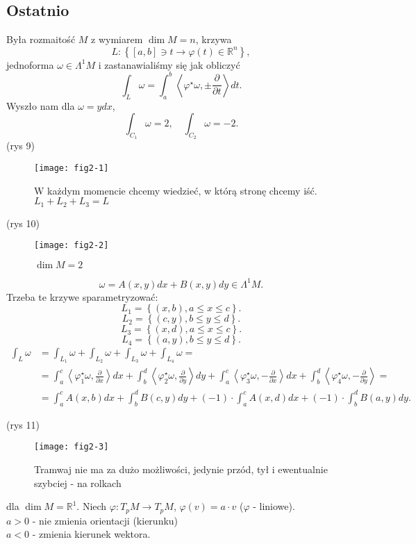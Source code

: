 \documentclass[../main.tex]{subfiles}
\begin{document}
    \subsection{Ostatnio}
    Była rozmaitość $M$ z wymiarem $\dim M = n$, krzywa
    \[
        L : \left\{ [a,b]\ni t \to \varphi(t)\in \mathbb{R}^n \right\}
    ,\]
jednoforma $\omega \in \Lambda^1M$ i zastanawialiśmy się jak obliczyć
\[
\int_L\omega = \int_a^b\left<\varphi^\star \omega, \pm\frac{\partial }{\partial t}  \right>dt
.\]
Wyszło nam dla $\omega = ydx$,
 \[
\int_{C_1}\omega = 2,\quad \int_{C_2}\omega = -2
.\]
(rys 9)
\begin{figure}[h]
    \centering
    \texttt{[image: fig2-1]}
    \caption{W każdym momencie chcemy wiedzieć, w którą stronę chcemy iść. $L_1 + L_2 + L_3 = L$}
    \label{fig:fig2-1}
\end{figure}
\begin{przyklad}
    (rys 10)
    \begin{figure}[h]
        \centering
        \texttt{[image: fig2-2]}
        \caption{$\dim M = 2$}
        \label{fig:fig2-2}
    \end{figure}
    \[
        \omega = A(x,y)dx + B(x,y)dy\in \Lambda^1M
    .\]
Trzeba te krzywe sparametryzować:
\[
    L_1 = \left\{ (x,b), a \le x \le c \right\}
.\]
\[
    L_2 = \left\{ (c,y), b \le y \le d \right\}
.\]
\[
    L_3 = \left\{ (x,d), a \le x \le c \right\}
.\]
\[
    L_4 = \left\{ (a,y), b \le y \le d \right\}
.\]
\begin{align*}
    \int_L\omega &= \int_{L_1}\omega + \int_{L_2}\omega + \int_{L_3}\omega + \int_{L_4}\omega =\\
    &= \int_a^c\left<\varphi_1^\star\omega, \frac{\partial }{\partial x}  \right>dx + \int_b^d\left<\varphi_2^\star \omega, \frac{\partial }{\partial y}  \right>dy + \int_a^c\left<\varphi^\star_3\omega, -\frac{\partial }{\partial x}  \right>dx + \int_b^d\left<\varphi_4^\star \omega, -\frac{\partial }{\partial y}  \right> =\\
    &= \int_a^c A(x,b)dx + \int_b^d B(c,y)dy + (-1)\cdot \int_a^cA(x,d)dx + (-1)\cdot \int_b^dB(a,y)dy
.\end{align*}
\end{przyklad}
(rys 11)\\
\begin{figure}[h]
    \centering
    \texttt{[image: fig2-3]}
    \caption{Tramwaj nie ma za dużo możliwości, jedynie przód, tył i ewentualnie szybciej - na rolkach}
    \label{fig:fig2-3}
\end{figure}
dla $\dim M = \mathbb{R}^1$. Niech $\varphi : T_pM \to T_pM$, $\varphi(v) = a\cdot v$ ($\varphi$ - liniowe).\\
$a > 0$ - nie zmienia orientacji (kierunku)\\
$a < 0$ - zmienia kierunek wektora.
\end{document}
